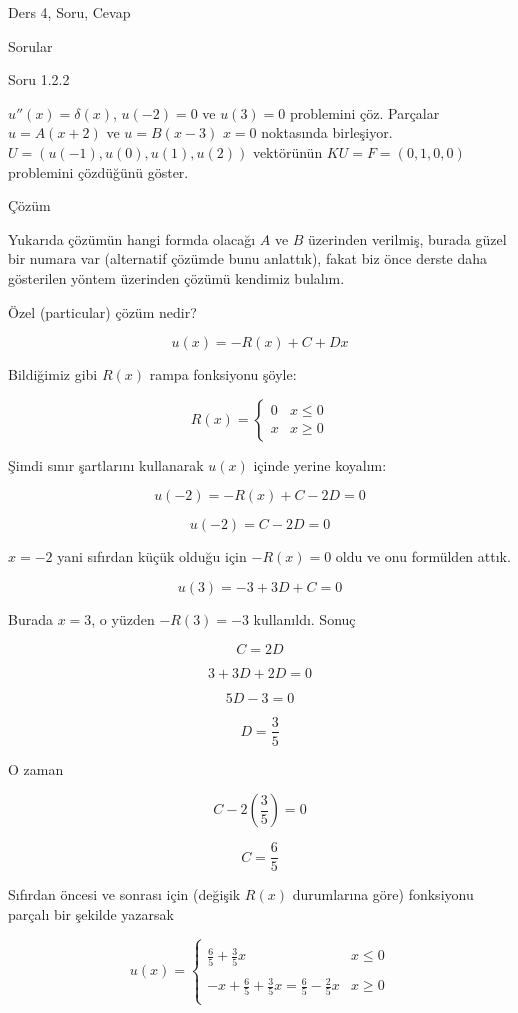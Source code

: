 \documentclass[12pt,fleqn]{article}\usepackage{../../common}
\begin{document}
Ders 4, Soru, Cevap


Sorular

Soru 1.2.2

$u''(x) = \delta(x)$, $u(-2) = 0$ ve $u(3) = 0$ problemini çöz. Parçalar
$u = A(x+2)$ ve $u=B(x-3)$ $x=0$ noktasında birleşiyor.
$U = (u(-1), u(0), u(1), u(2))$ vektörünün $KU=F=(0,1,0,0)$ problemini
çözdüğünü göster.

Çözüm

Yukarıda çözümün hangi formda olacağı $A$ ve $B$ üzerinden verilmiş, burada
güzel bir numara var (alternatif çözümde bunu anlattık), fakat biz önce
derste daha gösterilen yöntem üzerinden çözümü kendimiz bulalım.

Özel (particular) çözüm nedir? 

$$ u(x) = -R(x) + C + Dx$$

Bildiğimiz gibi $R(x)$ rampa fonksiyonu şöyle:

$$ 
R(x) = \left\{ \begin{array}{ll}
0 & x \le 0 \\
x & x \ge 0 
\end{array} \right.
 $$

Şimdi sınır şartlarını kullanarak $u(x)$ içinde yerine koyalım:

$$ u(-2) = -R(x) + C - 2D = 0 $$

$$ u(-2) = C - 2D = 0 $$

$x=-2$ yani sıfırdan küçük olduğu için $-R(x)=0$ oldu ve onu formülden attık.

$$ u(3) = -3 + 3D + C = 0 $$

Burada $x=3$, o yüzden $-R(3) = -3$ kullanıldı. Sonuç

$$ C = 2D $$

$$ 3 + 3D + 2D = 0 $$

$$ 5D - 3 = 0 $$

$$ D = \frac{3}{5} $$

O zaman

$$ C - 2(\frac{3}{5}) = 0 $$

$$ C = \frac{6}{5} $$

Sıfırdan öncesi ve sonrası için (değişik $R(x)$ durumlarına göre)
fonksiyonu parçalı bir şekilde yazarsak

$$ u(x) =
\left\{ \begin{array}{ll}
& \\
\frac{6}{5} + \frac{3}{5}x & x \le 0 \\
& \\
-x + \frac{6}{5} + \frac{3}{5}x = \frac{6}{5} - \frac{2}{5}x & x \ge 0 \\
& 
\end{array} \right.
 $$
\end{document}
